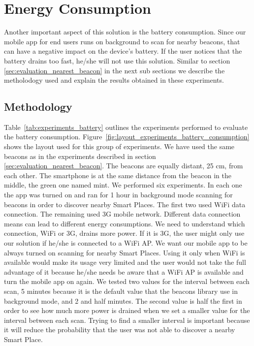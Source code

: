 \section{Energy Consumption}
\label{sec:evaluation_energy_consumption}
Another important aspect of this solution is the battery consumption.
Since our mobile app for end users runs on background to scan for nearby beacons, that can have a negative impact on the device's battery. If the user notices that the battery drains too fast, he/she will not use this solution.
Similar to section \ref{sec:evaluation_nearest_beacon} in the next sub sections we describe the metholodogy used and explain the results obtained in these experiments.

\subsection{Methodology}
\label{sub:evaluation_energy_consumption_methodology}
Table~\ref{tab:experiments_battery} outlines the experiments performed to evaluate the battery consumption.
Figure~\ref{fig:layout_experiments_battery_consumption} shows the layout used for this group of experiments.
We have used the same beacons as in the experiments described in section \ref{sec:evaluation_nearest_beacon}.
The beacons are equally distant, 25 cm, from each other.
The smartphone is at the same distance from the beacon in the middle, the green one named mint.
We performed six experiments.
In each one the app was turned on and ran for 1 hour in background mode scanning for beacons in order to discover nearby Smart Places.
The first two used \gls{WiFi} data connection.
The remaining used \gls{3G} mobile network.
Different data connection means can lead to different energy consumptions.
We need to understand which connection, \gls{WiFi} or \gls{3G}, drains more power.
If it is \gls{3G}, the user might only use our solution if he/she is connected to a \gls{WiFi} \gls{AP}.
We want our mobile app to be always turned on scanning for nearby Smart Places.
Using it only when \gls{WiFi} is available would make its usage very limited and the user would not take the full advantage of it because he/she needs be aware that a \gls{WiFi} \gls{AP} is available and turn the mobile app on again.
We tested two values for the interval between each scan, 5 minutes because it is the default value that the beacons library use in background mode, and 2 and half minutes.
The second value is half the first in order to see how much more power is drained when we set a smaller value for the interval between each scan.
Trying to find a smaller interval is important because it will reduce the probability that the user was not able to discover a nearby Smart Place.

